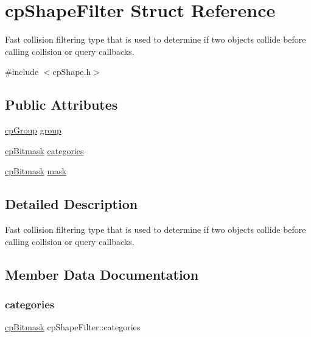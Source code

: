 \hypertarget{structcpShapeFilter}{}\section{cp\+Shape\+Filter Struct Reference}
\label{structcpShapeFilter}


Fast collision filtering type that is used to determine if two objects collide before calling collision or query callbacks.  




{\ttfamily \#include $<$cp\+Shape.\+h$>$}

\subsection*{Public Attributes}
\begin{DoxyCompactItemize}
\item 
\hyperlink{group__basicTypes_gacd811b1135a8f4a3e5cc019552b18b1a}{cp\+Group} \hyperlink{structcpShapeFilter_a6d29bf3cc7f406cdf834465f9de71c21}{group}
\item 
\hyperlink{group__basicTypes_gae7ff94f62e00cae288c1991958822743}{cp\+Bitmask} \hyperlink{structcpShapeFilter_a916b2d61e3ea9d1e7d26a6bc59ac955b}{categories}
\item 
\hyperlink{group__basicTypes_gae7ff94f62e00cae288c1991958822743}{cp\+Bitmask} \hyperlink{structcpShapeFilter_a0ee36d60cbc25e1abf18aa1508d7a537}{mask}
\end{DoxyCompactItemize}


\subsection{Detailed Description}
Fast collision filtering type that is used to determine if two objects collide before calling collision or query callbacks. 

\subsection{Member Data Documentation}
\mbox{\label{structcpShapeFilter_a916b2d61e3ea9d1e7d26a6bc59ac955b}} 
\subsubsection{\texorpdfstring{categories}{categories}}
{\footnotesize\ttfamily \hyperlink{group__basicTypes_gae7ff94f62e00cae288c1991958822743}{cp\+Bitmask} cp\+Shape\+Filter\+::categories}

